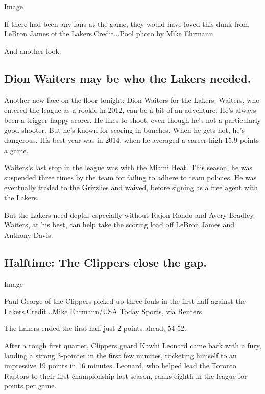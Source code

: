 Image

If there had been any fans at the game, they would have loved this dunk
from LeBron James of the Lakers.Credit...Pool photo by Mike Ehrmann

And another look:

\hypertarget{dion-waiters-may-be-who-the-lakers-needed}{%
\subsection{Dion Waiters may be who the Lakers
needed.}\label{dion-waiters-may-be-who-the-lakers-needed}}

Another new face on the floor tonight: Dion Waiters for the Lakers.
Waiters, who entered the league as a rookie in 2012, can be a bit of an
adventure. He's always been a trigger-happy scorer. He likes to shoot,
even though he's not a particularly good shooter. But he's known for
scoring in bunches. When he gets hot, he's dangerous. His best year was
in 2014, when he averaged a career-high 15.9 points a game.

Waiters's last stop in the league was with the Miami Heat. This season,
he was suspended three times by the team for failing to adhere to team
policies. He was eventually traded to the Grizzlies and waived, before
signing as a free agent with the Lakers.

But the Lakers need depth, especially without Rajon Rondo and Avery
Bradley. Waiters, at his best, can help take the scoring load off LeBron
James and Anthony Davis.

\hypertarget{halftime-the-clippers-close-the-gap}{%
\subsection{Halftime: The Clippers close the
gap.}\label{halftime-the-clippers-close-the-gap}}

Image

Paul George of the Clippers picked up three fouls in the first half
against the Lakers.Credit...Mike Ehrmann/USA Today Sports, via Reuters

The Lakers ended the first half just 2 points ahead, 54-52.

After a rough first quarter, Clippers guard Kawhi Leonard came back with
a fury, landing a strong 3-pointer in the first few minutes, rocketing
himself to an impressive 19 points in 16 minutes. Leonard, who helped
lead the Toronto Raptors to their first championship last season, ranks
eighth in the league for points per game.

